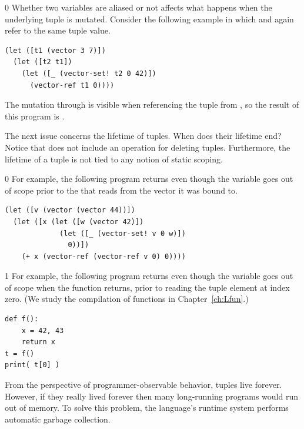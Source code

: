 \documentclass[7x10,nocrop]{TimesAPriori_MIT}%
\def\racketEd{0}
\def\pythonEd{1}
\def\edition{1}
\begin{document}
{\if\edition\racketEd        
Whether two variables are aliased or not affects what happens
when the underlying tuple is mutated.
Consider the following example in which  and 
again refer to the same tuple value.
\begin{center}
\begin{minipage}{0.96\textwidth}
\begin{lstlisting}
(let ([t1 (vector 3 7)])
  (let ([t2 t1])
    (let ([_ (vector-set! t2 0 42)])
      (vector-ref t1 0))))
\end{lstlisting}
\end{minipage}
\end{center}
The mutation through  is visible when referencing the tuple
from , so the result of this program is .
\fi}

The next issue concerns the lifetime of tuples. When does their
lifetime end?  Notice that \LangVec{} does not include an operation
for deleting tuples. Furthermore, the lifetime of a tuple is not tied
to any notion of static scoping.
%
{\if\edition\racketEd        
%
For example, the following program returns  even though the
variable  goes out of scope prior to the 
that reads from the vector it was bound to.
\begin{center}
\begin{minipage}{0.96\textwidth}
\begin{lstlisting}
(let ([v (vector (vector 44))])
  (let ([x (let ([w (vector 42)])
             (let ([_ (vector-set! v 0 w)])
               0))])
    (+ x (vector-ref (vector-ref v 0) 0))))
\end{lstlisting}
\end{minipage}
\end{center}
\fi}
%
{\if\edition\pythonEd
%
For example, the following program returns  even though the
variable  goes out of scope when the function returns, prior
to reading the tuple element at index zero. (We study the compilation
of functions in Chapter~\ref{ch:Lfun}.)
%  
\begin{center}
\begin{minipage}{0.96\textwidth}
\begin{lstlisting}
def f():
    x = 42, 43
    return x
t = f()
print( t[0] )
\end{lstlisting}
\end{minipage}
\end{center}
\fi}
%
From the perspective of programmer-observable behavior, tuples live
forever. However, if they really lived forever then many long-running
programs would run out of memory. To solve this problem, the
language's runtime system performs automatic garbage collection.
\end{document}
